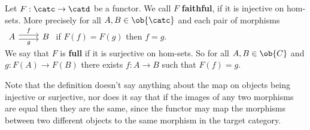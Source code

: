 \begin{definition}
    Let $F: \catc \to \catd$ be a functor. We call $F$ \textbf{faithful}, if it is injective on hom-sets. 
    More precisely for all $A,B\in\ob{\catc}$ and each pair of morphisms $\begin{tikzcd}
        A & B
        \arrow["g"', shift right, from=1-1, to=1-2]
        \arrow["f", shift left, from=1-1, to=1-2]
    \end{tikzcd}$ if $F(f)=F(g)$ then $f=g$.\\ 
    We say that $F$ is \textbf{full} if it is surjective on hom-sets.
    So for all $A,B\in\ob{C}$ and $g: F(A)\to F(B)$ there exists $f:A\to B$ such that $F(f)=g$.
\end{definition}
\begin{remark}
    Note that the definition doesn't say anything about the map on objects being injective or surjective,
    nor does it say that if the images of any two morphisms are equal then they are the same, since
    the functor may map the morphisms between two different objects to the same morphism in the target category.
\end{remark}


